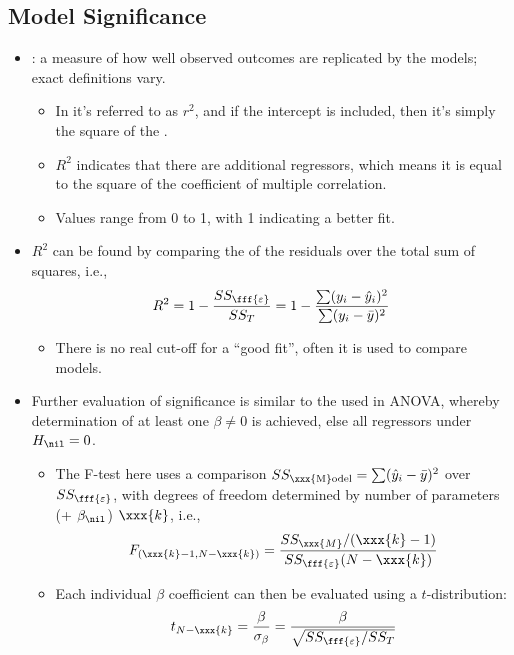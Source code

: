 \begin{itemize}
  \subsection{Model Significance}
  \begin{itemize}
    \item {}: a measure of how well observed outcomes are replicated by the models; exact definitions vary.
      \begin{itemize}
        \item In \hyperref[Subsection: Simple Regression]{} it's referred to as \(r^2\), and if the intercept is included, then it's simply the square of the \hyperref[Subsection: Pearson Correlation]{}.
        \item \(R^2\) indicates that there are additional regressors, which means it is equal to the square of the coefficient of multiple correlation. 
        \item Values range from 0 to 1, with 1 indicating a better fit.
      \end{itemize}
    \item \(R^2\) can be found by comparing the \hyperref[Subsection: Sum of Squares]{} of the residuals over the total sum of squares, i.e.,
    \[%
    R^2 = 1 - \frac{SS_\fff{\varepsilon}}{SS_T} = 1 - \frac{\sum(y_i - \hat{y}_i)^2}{\sum(y_i - \bar{y})^2}
    \]%
    \begin{itemize}
      \item There is no real cut-off for a ``good fit'', often it is used to compare models.
    \end{itemize}
  \item Further evaluation of significance is similar to the \hyperref[Subsection: F-Test]{} used in ANOVA, whereby determination of at least one \(\beta \neq 0\) is achieved, else all regressors under \(H_\nil = 0 \).
    \begin{itemize}
      \item The F-test here uses a comparison \(SS_{\text{\xxx{M}odel}} = \sum(\hat{y}_i-\bar{y})^2\) over \(SS_\fff{\varepsilon}\), with degrees of freedom determined by number of parameters (+ \(\beta_\nil\)) \(\xxx{k}\), i.e.,
      \[%
      F_{(\xxx{k}-1,N-\xxx{k})} = \frac{SS_\xxx{M}/(\xxx{k}-1)}{SS_\fff{\varepsilon}(N-\xxx{k})}
      \]%
      \item Each individual \(\beta \) coefficient can then be evaluated using a \(t\)-distribution:
      \[%
      t_{N-\xxx{k}} = \frac{\beta}{\sigma_\beta} = \frac{\beta}{\sqrt{SS_\fff{\varepsilon}/SS_T}}
      \]%
      

\end{itemize}
\end{itemize}
\end{itemize}

